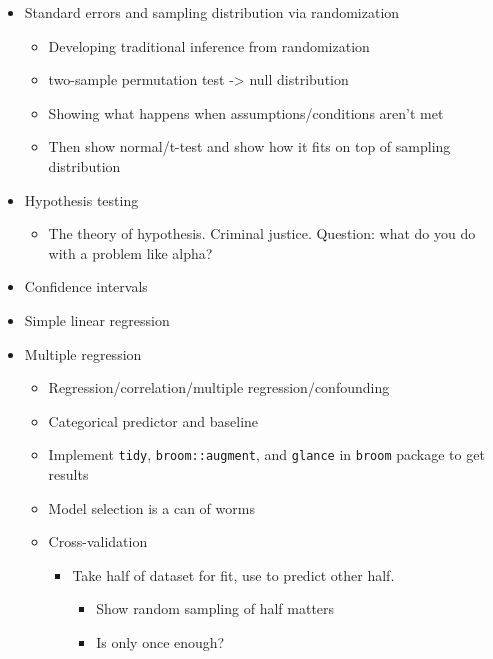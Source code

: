 \documentclass[]{tufte-book}
\providecommand{\tightlist}{%
  \setlength{\itemsep}{0pt}\setlength{\parskip}{0pt}}
\begin{document}
\begin{itemize}
\tightlist
\item
  Standard errors and sampling distribution via randomization

  \begin{itemize}
  \tightlist
  \item
    Developing traditional inference from randomization
  \item
    two-sample permutation test -\textgreater{} null distribution\\
  \item
    Showing what happens when assumptions/conditions aren't met
  \item
    Then show normal/t-test and show how it fits on top of sampling
    distribution
  \end{itemize}
\item
  Hypothesis testing

  \begin{itemize}
  \tightlist
  \item
    The theory of hypothesis. Criminal justice. Question: what do you do
    with a problem like alpha?
  \end{itemize}
\item
  Confidence intervals
\item
  Simple linear regression
\item
  Multiple regression

  \begin{itemize}
  \tightlist
  \item
    Regression/correlation/multiple regression/confounding
  \item
    Categorical predictor and baseline
  \item
    Implement \texttt{tidy}, \texttt{broom::augment}, and
    \texttt{glance} in \texttt{broom} package to get results
  \item
    Model selection is a can of worms
  \item
    Cross-validation

    \begin{itemize}
    \tightlist
    \item
      Take half of dataset for fit, use to predict other half.

      \begin{itemize}
      \tightlist
      \item
        Show random sampling of half matters
      \item
        Is only once enough?
      \end{itemize}
    \end{itemize}
  \end{itemize}
\end{itemize}
\end{document}
